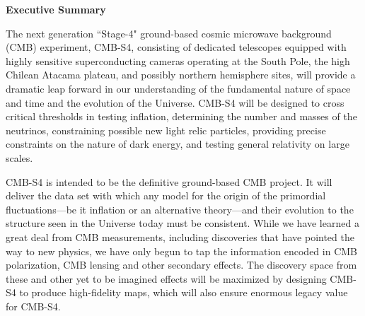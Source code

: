 \begin{center}
  {\Large \bf Executive Summary}
\end{center}

The next generation ``Stage-4" ground-based cosmic microwave background (CMB) experiment, CMB-S4, consisting of dedicated telescopes equipped with highly sensitive superconducting cameras operating at the South Pole, the high Chilean Atacama plateau, and possibly northern hemisphere sites, will provide a dramatic leap forward in our understanding of the fundamental nature of space and time and the evolution of the Universe. CMB-S4 will be designed to cross critical thresholds in testing inflation, determining the number and masses of the neutrinos, constraining possible new light relic particles, providing precise constraints on the nature of dark energy, and testing general relativity on large scales. 

CMB-S4 is intended to be the definitive ground-based CMB project. It will deliver the data set with which any model for the origin of the primordial fluctuations---be it inflation or an alternative theory---and their evolution to the structure seen in the Universe today must be consistent. %
While we have learned a great deal from CMB measurements, including discoveries that have pointed the way to new physics, we have only begun to tap the information encoded in CMB polarization, CMB lensing and other secondary effects.  The discovery space from these and other yet to be imagined effects will be  maximized by designing CMB-S4 to produce high-fidelity maps, which will also ensure enormous legacy value for CMB-S4.


